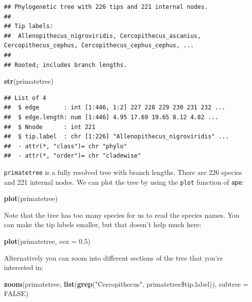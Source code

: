 \documentclass[12pt]{article}
\newcommand{\KeywordTok}[1]{\textcolor[rgb]{0.13,0.29,0.53}{\textbf{{#1}}}}
\newcommand{\DataTypeTok}[1]{\textcolor[rgb]{0.13,0.29,0.53}{{#1}}}
\newcommand{\FloatTok}[1]{\textcolor[rgb]{0.00,0.00,0.81}{{#1}}}
\newcommand{\StringTok}[1]{\textcolor[rgb]{0.31,0.60,0.02}{{#1}}}
\newcommand{\OtherTok}[1]{\textcolor[rgb]{0.56,0.35,0.01}{{#1}}}
\newcommand{\NormalTok}[1]{{#1}}
\begin{document}
\begin{verbatim}
## Phylogenetic tree with 226 tips and 221 internal nodes.
## 
## Tip labels:
##  Allenopithecus_nigroviridis, Cercopithecus_ascanius, 
Cercopithecus_cephus, Cercopithecus_cephus_cephus, ...
## 
## Rooted; includes branch lengths.
\end{verbatim}

\begin{snugshade}
\begin{Highlighting}[]
\KeywordTok{str}\NormalTok{(primatetree)}
\end{Highlighting}
\end{snugshade}

\begin{verbatim}
## List of 4
##  $ edge       : int [1:446, 1:2] 227 228 229 230 231 232 ...
##  $ edge.length: num [1:446] 4.95 17.69 19.65 8.12 4.82 ...
##  $ Nnode      : int 221
##  $ tip.label  : chr [1:226] "Allenopithecus_nigroviridis" ...
##  - attr(*, "class")= chr "phylo"
##  - attr(*, "order")= chr "cladewise"
\end{verbatim}

\texttt{primatetree} is a fully resolved tree with branch lengths. There are 226
species and 221 internal nodes. We can plot the tree by using the \texttt{plot}
function of \texttt{ape}:

\begin{snugshade}
\begin{Highlighting}[]
\KeywordTok{plot}\NormalTok{(primatetree}\NormalTok{)}
\end{Highlighting}
\end{snugshade}

Note that the tree has too many species for us to read the species names. You can make the tip labels smaller, but that doesn’t help much here:

\begin{snugshade}
\begin{Highlighting}[]
\KeywordTok{plot}\NormalTok{(primatetree, }\DataTypeTok{cex =} \FloatTok{0.5}\NormalTok{)}
\end{Highlighting}
\end{snugshade}

Alternatively you can zoom into different sections of the tree that you’re interested in:

\begin{snugshade}
\begin{Highlighting}[]
\KeywordTok{zoom}\NormalTok{(primatetree, }\KeywordTok{list}\NormalTok{(}\KeywordTok{grep}\NormalTok{(}\StringTok{"Cercopithecus"}\NormalTok{, primatetree\$tip.label)), }
      \DataTypeTok{subtree =} \OtherTok{FALSE}\NormalTok{)}
\end{Highlighting}
\end{snugshade}
\end{document}

